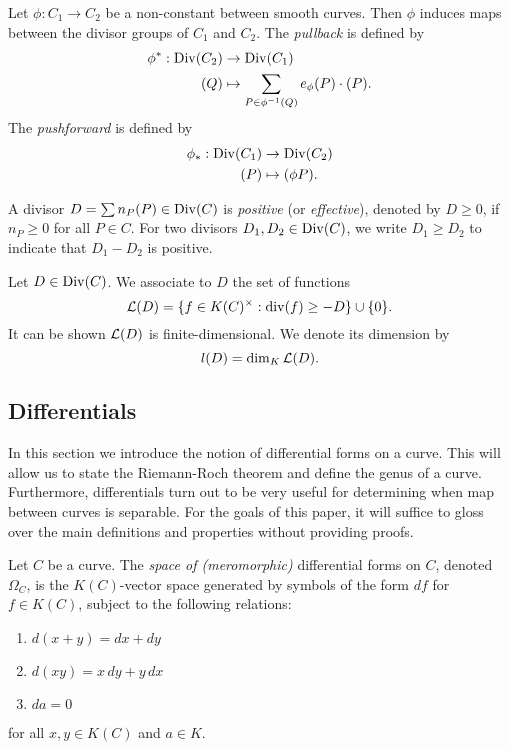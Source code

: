 \begin{definition}
	Let $\phi: C_1 \to C_2$ be a non-constant between smooth curves.
	Then $\phi$ induces maps between the divisor groups of $C_1$ and $C_2$.
	The \emph{pullback} is defined by
	\begin{align*}
		\phi^*: \operatorname{Div}(C_2) &\to \operatorname{Div}(C_1)\\
		(Q) &\mapsto \sum_{P \in \phi^{-1}(Q)}e_\phi(P)\cdot(P).
	\end{align*}
	The \emph{pushforward} is defined by
	\begin{align*}
		\phi_*: \operatorname{Div}(C_1) &\to \operatorname{Div}(C_2)\\
		(P) &\mapsto (\phi P).
	\end{align*}
\end{definition}

\begin{definition}
	A divisor $D = \sum n_P(P) \in \operatorname{Div}(C)$ is \emph{positive} (or
	\emph{effective}), denoted by
	$D \geq 0$, if $n_P \geq 0$ for all $P \in C$.
	For two divisors $D_1, D_2 \in \operatorname{Div}(C)$, we write $D_1 \geq D_2$
	to indicate that $D_1 - D_2$ is positive.
\end{definition}

\begin{definition}
	Let $D \in \operatorname{Div}(C)$. We associate to $D$ the set of functions
	\begin{equation*}
		\mathcal{L}(D) = \{f \in K(C)^\times: \operatorname{div}(f) \geq -D\} \cup \{ 0 \}.
	\end{equation*}
	It can be shown $\mathcal{L}(D)$ is finite-dimensional. We denote its dimension by
	\begin{equation*}
		l(D) = \dim_K \mathcal{L}(D).
	\end{equation*}
\end{definition}

\subsection{Differentials}

In this section we introduce the notion of differential forms on a curve.
This will allow us to state the Riemann-Roch theorem and define the genus of a
curve. Furthermore, differentials turn out to be very useful for determining
when map between curves is separable.
For the goals of this paper, it will suffice to gloss over the main definitions
and properties without providing proofs.

\begin{definition}
	Let $C$ be a curve. 
	The \emph{space of (meromorphic)} differential forms on $C$, denoted
	$\Omega_C$, is the $K(C)$-vector space generated by symbols of the form
	$df$ for $f\in K(C)$, subject to the following relations:
	\begin{enumerate}[itemsep=0em]
		\item $d(x + y) = dx + dy$
		\item $d(xy) = x\,dy + y\,dx$
		\item $da = 0$
	\end{enumerate}
	for all $x, y \in K(C)$ and $a \in K$.
\end{definition}

